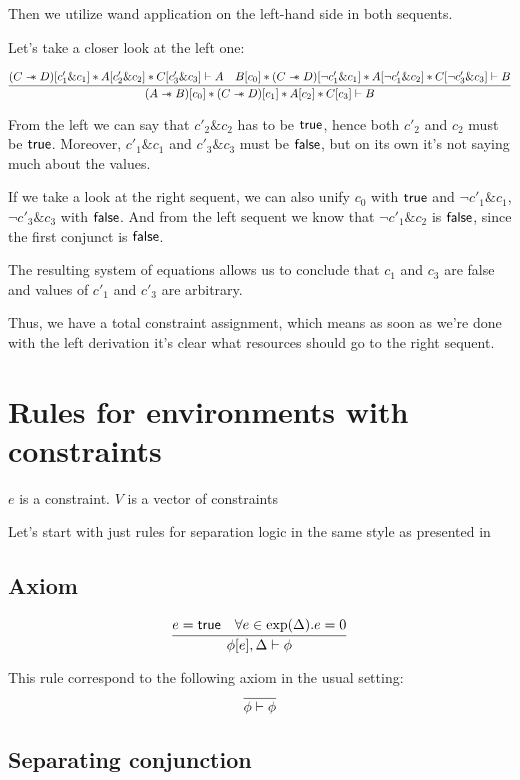 Then we utilize wand application on the left-hand side in both sequents.

Let's take a closer look at the left one:

$$
\infer{(A \wand B)[c_0] \ast (C \wand D)[c_1] \ast
        A[c_2] \ast C[c_3] \vdash B}
      {(C \wand D)[c'_1 \& c_1] \ast
       A[c'_2 \& c_2] \ast C[c'_3 \& c_3] \vdash A
       &
       B[c_0] \ast (C \wand D)[\neg c'_1 \& c_1] \ast
       A[\neg c'_1 \& c_2] \ast C[\neg c'_3 \& c_3] \vdash B}
$$

From the left  we can say that $c'_2 \& c_2$ has to be $\textsf{true}$, hence both $c'_2$ and $c_2$ must be $\textsf{true}$.
Moreover, $c'_1 \& c_1$ and $c'_3 \& c_3$ must be $\textsf{false}$, but on its own it's not saying much about the values.

If we take a look at the right sequent, we can also unify $c_0$ with $\textsf{true}$ and
$\neg c'_1 \& c_1$, $\neg c'_3 \& c_3$ with $\textsf{false}$.
And from the left sequent we know that $\neg c'_1 \& c_2$ is $\textsf{false}$, since the first conjunct is $\textsf{false}$.

The resulting system of equations allows us to conclude that $c_1$ and $c_3$ are false and values of $c'_1$ and $c'_3$ are arbitrary.

Thus, we have a total constraint assignment, which means as soon as we're done with the left derivation it's clear what resources should go to the right sequent.

\section{Rules for environments with constraints}

$e$ is a constraint.
$V$ is a vector of constraints

Let's start with just rules for separation logic in the same style as presented in \citet{Harland_Pym_2003}

\subsection{Axiom}

$$\infer{\phi[e], \Delta \vdash \phi}
      {e = \true &
       \forall e \in \expr(\Delta). e = 0}$$

This rule correspond to the following axiom in the usual setting:
$$\infer{\phi \vdash \phi}{}$$

\subsection{Separating conjunction}


